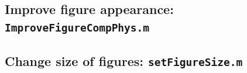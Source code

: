 \subsection{Improve figure appearance: \texttt{ImproveFigureCompPhys.m}}


\subsection{Change size of figures: \texttt{setFigureSize.m}}



